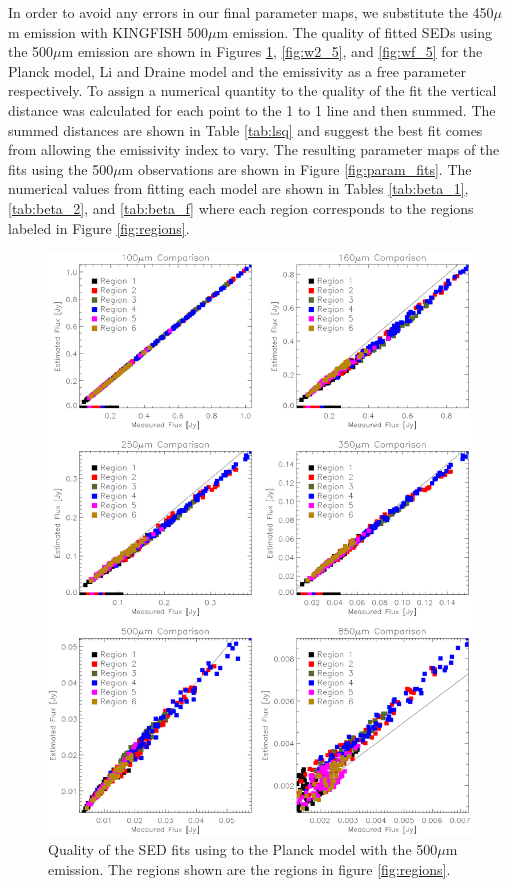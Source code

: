 In order to avoid any errors in our final parameter maps, we substitute the 450$\mu$m emission with KINGFISH 500$\mu$m emission.  The quality of fitted SEDs using the 500$\mu$m emission are shown in Figures \ref{fig:w1_5}, \ref{fig:w2_5}, and \ref{fig:wf_5} for the Planck model, Li and Draine model and the emissivity as a free parameter respectively.  To assign a numerical quantity to the quality of the fit the vertical distance was calculated for each point to the 1 to 1 line and then summed.  The summed distances are shown in Table \ref{tab:lsq} and suggest the best fit comes from allowing the emissivity index to vary.  The resulting parameter maps of the fits using the 500$\mu$m observations are shown in Figure \ref{fig:param_fits}. The numerical values from fitting each model are shown in Tables \ref{tab:beta_1}, \ref{tab:beta_2}, and \ref{tab:beta_f} where each region corresponds to the regions labeled in Figure \ref{fig:regions}.

\begin{figure}
  \centering
  \includegraphics[width=1.\textwidth]{sed_imgs/flux_compare_1_5.eps}
  \caption[Planck Model SED Fit Quality Using 500$\mu$m Data]{Quality of the SED fits using to the Planck model with the 500$\mu$m emission.  The regions shown are the regions in figure \ref{fig:regions}.}
  \label{fig:w1_5}
\end{figure}

